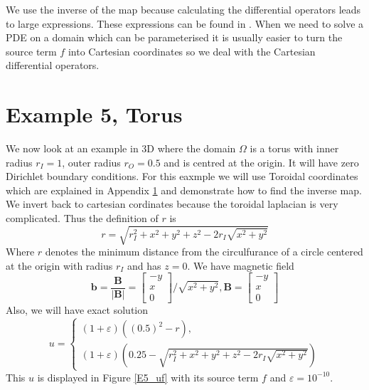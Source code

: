 \documentclass[12pt]{ociamthesis}
\begin{document}
We use the inverse of the map because calculating the differential operators leads to large expressions. These expressions can be found in \cite{}. When we need to solve a PDE on a domain which can be parameterised it is usually easier to turn the source term $f$ into Cartesian coordinates so we deal with the Cartesian differential operators.

\section{Example 5, Torus}
We now look at an example in 3D where the domain $\Omega $ is a torus with inner radius $r_I = 1$, outer radius $r_O = 0.5$ and is centred at the origin. It will have zero Dirichlet boundary conditions. For this eaxmple we will use Toroidal coordinates which are explained in Appendix \ref{} and demonstrate how to find the inverse map. We invert back to cartesian cordinates because the toroidal laplacian \cite{} is very complicated. Thus the definition of $r$ is
\begin{equation}
r = \sqrt{r_I^2 + x^2 + y^2 + z^2 -2r_I\sqrt{x^2+y^2}}
\end{equation}
Where $r$ denotes the minimum distance from the circulfurance of a circle centered at the origin with radius $r_I$ and has $z=0$. We have magnetic field 
\begin{equation}
\mathbf{b} = \frac{\mathbf{B}}{|\mathbf{B}|} = 
\left[ \begin{matrix}
-y\\
 x \\
 0
\end{matrix} \right]/\sqrt{x^2+y^2}, 
\mathbf{B} = \left[ \begin{matrix}
-y\\
 x\\
 0
\end{matrix} \right]
\end{equation}
Also, we will have exact solution
\begin{equation}
u = 
\begin{cases}
(1+\varepsilon)((0.5)^2 - r ),\\
(1+\varepsilon)(0.25 -  \sqrt{r_I^2 + x^2 + y^2 + z^2 -2r_I\sqrt{x^2+y^2}})
\end{cases}
\end{equation}
This $u$ is displayed in Figure \ref{E5_uf} with its source term $f$ and $\varepsilon=10^{-10}$.
\end{document}

